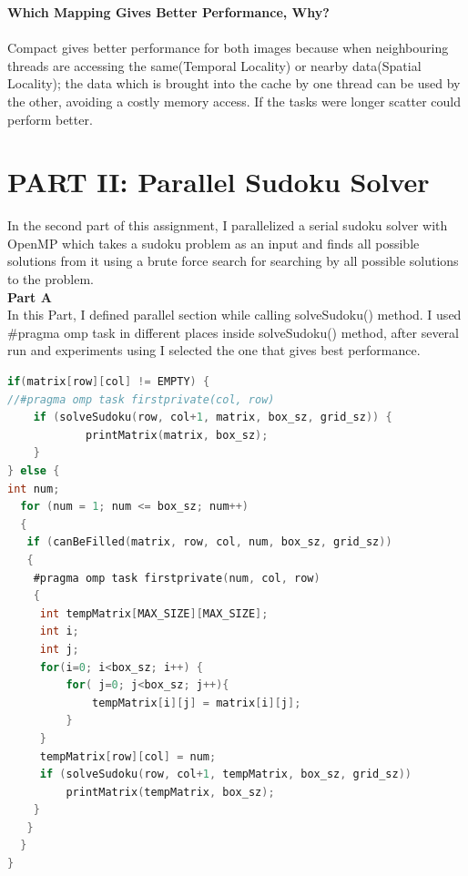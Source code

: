 \documentclass{article}
\newcommand\tab[1][0.5cm]{\hspace*{#1}}
\begin{document}
\textbf{Which Mapping Gives Better Performance, Why?}\\
\\ \tab Compact gives better performance for both images because 
when neighbouring threads are accessing the same(Temporal Locality) or nearby data(Spatial Locality);
the data which is brought into the cache by one thread can be used 
by the other, avoiding a costly memory access.
If the tasks were longer scatter could perform better. 

\newpage

\section{PART II: Parallel Sudoku Solver}
\tab In the second part of this assignment, I parallelized a serial sudoku solver with OpenMP
which takes a sudoku problem as an input and finds all possible solutions from it 
using a brute force search for searching by all possible solutions to the problem. 
\\ \textbf{Part A}
\\ \tab In this Part, I defined parallel section while calling solveSudoku() method. I used \#pragma omp task in different places inside solveSudoku() method, after several run and experiments using I selected the one that gives best performance.
\begin{lstlisting}[language=C]
if(matrix[row][col] != EMPTY) {
//#pragma omp task firstprivate(col, row)
    if (solveSudoku(row, col+1, matrix, box_sz, grid_sz)) { 
            printMatrix(matrix, box_sz); 
    }
} else {
int num;
  for (num = 1; num <= box_sz; num++) 
  { 					
   if (canBeFilled(matrix, row, col, num, box_sz, grid_sz)) 
   {  
    #pragma omp task firstprivate(num, col, row)
    {
     int tempMatrix[MAX_SIZE][MAX_SIZE];
     int i;
     int j;
     for(i=0; i<box_sz; i++) {
         for( j=0; j<box_sz; j++){
             tempMatrix[i][j] = matrix[i][j];
         }
     }
     tempMatrix[row][col] = num; 				
     if (solveSudoku(row, col+1, tempMatrix, box_sz, grid_sz)) 
         printMatrix(tempMatrix, box_sz);
    }					
   }
  }
}		
\end{lstlisting}
\newpage
\end{document}
